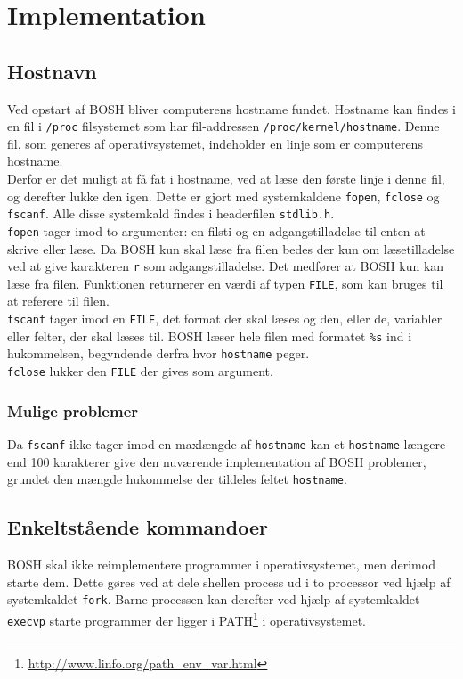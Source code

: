 \section{Implementation}
\subsection{Hostnavn}
Ved opstart af BOSH bliver computerens hostname fundet. Hostname kan findes i en fil i \texttt{/proc} filsystemet som har fil-addressen \texttt{/proc/kernel/hostname}. Denne fil, som generes af operativsystemet, indeholder en linje som er computerens hostname.\\

Derfor er det muligt at få fat i hostname, ved at læse den første linje i denne fil, og derefter lukke den igen. Dette er gjort med systemkaldene \texttt{fopen}, \texttt{fclose} og \texttt{fscanf}. Alle disse systemkald findes i headerfilen \texttt{stdlib.h}.\\

\texttt{fopen} tager imod to argumenter: en filsti og en adgangstilladelse til enten at skrive eller læse. Da BOSH kun skal læse fra filen bedes der kun om læsetilladelse ved at give karakteren \texttt{r} som adgangstilladelse. Det medfører at BOSH kun kan læse fra filen. Funktionen returnerer en værdi af typen \texttt{FILE}, som kan bruges til at referere til filen.\\

\texttt{fscanf} tager imod en \texttt{FILE}, det format der skal læses og den, eller de, variabler eller felter, der skal læses til. BOSH læser hele filen med formatet \texttt{\%s} ind i hukommelsen, begyndende derfra hvor \texttt{hostname} peger.\\

\texttt{fclose} lukker den \texttt{FILE} der gives som argument.

\subsubsection{Mulige problemer}
Da \texttt{fscanf} ikke tager imod en maxlængde af \texttt{hostname} kan et \texttt{hostname} længere end 100 karakterer give den nuværende implementation af BOSH problemer, grundet den mængde hukommelse der tildeles feltet \texttt{hostname}.

\subsection{Enkeltstående kommandoer}
BOSH skal ikke reimplementere programmer i operativsystemet, men derimod starte dem. Dette gøres ved at dele shellen process ud i to processor ved hjælp af systemkaldet \texttt{fork}. Barne-processen kan derefter ved hjælp af systemkaldet \texttt{execvp} starte programmer der ligger i PATH\footnote{\url{http://www.linfo.org/path_env_var.html}} i operativsystemet.\\


